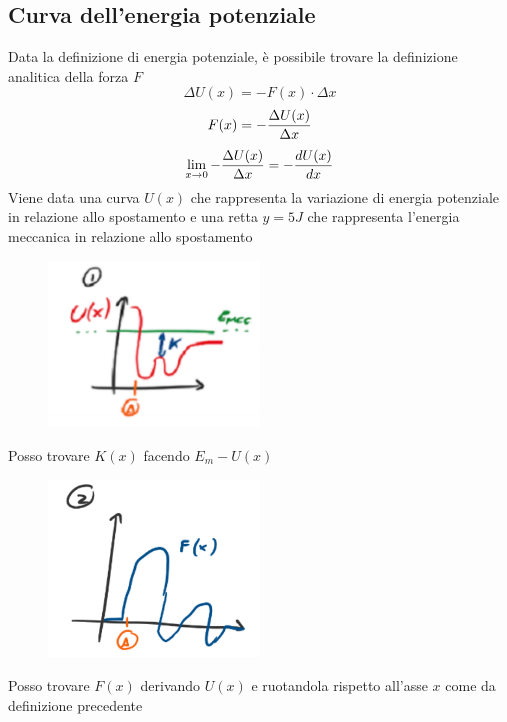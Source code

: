 \documentclass[12pt]{article}
\begin{document}
    \subsection{Curva dell'energia potenziale}
    Data la definizione di energia potenziale, è possibile trovare la definizione analitica della forza $F$
    $$\Delta U (x) = -F(x)\cdot \Delta x$$
    $$F(x) = - {\Delta U (x) \over \Delta x}$$
    $$\lim_{x\to 0} {- {\Delta U (x) \over \Delta x}} = {-{dU(x) \over dx}}$$
    Viene data una curva $U(x)$ che rappresenta la variazione di energia potenziale in relazione allo spostamento e una retta $y = 5 J$ che rappresenta l'energia meccanica in relazione allo spostamento
    \FloatBarrier
    \begin{figure}[!htb]
        \centering
        \includegraphics[width=0.5\textwidth]{graph1.PNG}
    \end{figure}
    \FloatBarrier
    Posso trovare $K(x)$ facendo $E_m - U(x)$
    \FloatBarrier
    \begin{figure}[!htb]
        \centering
        \includegraphics[width=0.5\textwidth]{graph2.PNG}
    \end{figure}
    \FloatBarrier
    Posso trovare $F(x)$ derivando $U(x)$ e ruotandola rispetto all'asse $x$ come da definizione precedente
\end{document}
